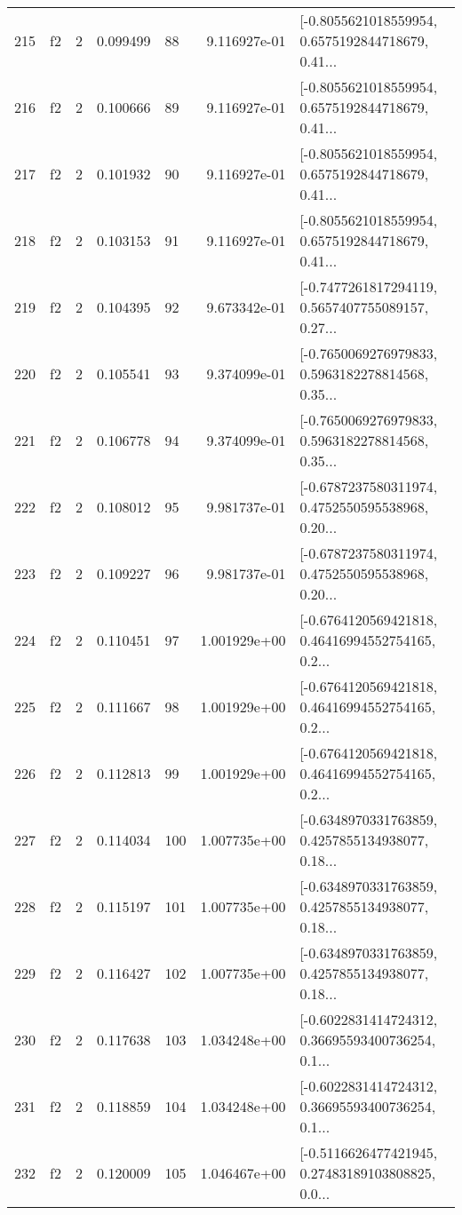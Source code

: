 \begin{tabular}{lllrlrl}
215 &  f2 &   2 &  0.099499 &   88 &  9.116927e-01 &  [-0.8055621018559954, 0.6575192844718679, 0.41... \\
216 &  f2 &   2 &  0.100666 &   89 &  9.116927e-01 &  [-0.8055621018559954, 0.6575192844718679, 0.41... \\
217 &  f2 &   2 &  0.101932 &   90 &  9.116927e-01 &  [-0.8055621018559954, 0.6575192844718679, 0.41... \\
218 &  f2 &   2 &  0.103153 &   91 &  9.116927e-01 &  [-0.8055621018559954, 0.6575192844718679, 0.41... \\
219 &  f2 &   2 &  0.104395 &   92 &  9.673342e-01 &  [-0.7477261817294119, 0.5657407755089157, 0.27... \\
220 &  f2 &   2 &  0.105541 &   93 &  9.374099e-01 &  [-0.7650069276979833, 0.5963182278814568, 0.35... \\
221 &  f2 &   2 &  0.106778 &   94 &  9.374099e-01 &  [-0.7650069276979833, 0.5963182278814568, 0.35... \\
222 &  f2 &   2 &  0.108012 &   95 &  9.981737e-01 &  [-0.6787237580311974, 0.4752550595538968, 0.20... \\
223 &  f2 &   2 &  0.109227 &   96 &  9.981737e-01 &  [-0.6787237580311974, 0.4752550595538968, 0.20... \\
224 &  f2 &   2 &  0.110451 &   97 &  1.001929e+00 &  [-0.6764120569421818, 0.46416994552754165, 0.2... \\
225 &  f2 &   2 &  0.111667 &   98 &  1.001929e+00 &  [-0.6764120569421818, 0.46416994552754165, 0.2... \\
226 &  f2 &   2 &  0.112813 &   99 &  1.001929e+00 &  [-0.6764120569421818, 0.46416994552754165, 0.2... \\
227 &  f2 &   2 &  0.114034 &  100 &  1.007735e+00 &  [-0.6348970331763859, 0.4257855134938077, 0.18... \\
228 &  f2 &   2 &  0.115197 &  101 &  1.007735e+00 &  [-0.6348970331763859, 0.4257855134938077, 0.18... \\
229 &  f2 &   2 &  0.116427 &  102 &  1.007735e+00 &  [-0.6348970331763859, 0.4257855134938077, 0.18... \\
230 &  f2 &   2 &  0.117638 &  103 &  1.034248e+00 &  [-0.6022831414724312, 0.36695593400736254, 0.1... \\
231 &  f2 &   2 &  0.118859 &  104 &  1.034248e+00 &  [-0.6022831414724312, 0.36695593400736254, 0.1... \\
232 &  f2 &   2 &  0.120009 &  105 &  1.046467e+00 &  [-0.5116626477421945, 0.27483189103808825, 0.0... \\

\end{tabular}
